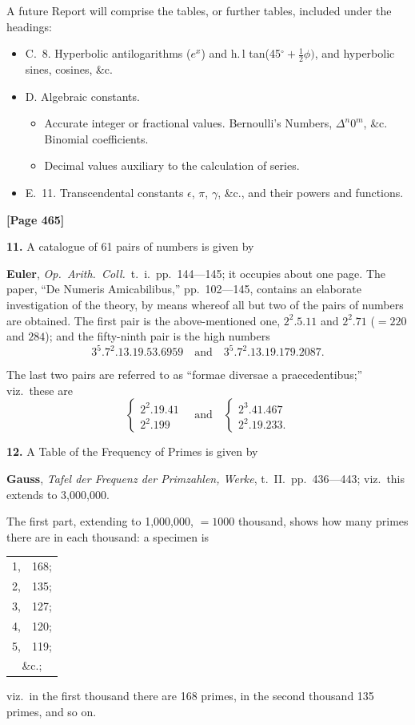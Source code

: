 \documentclass[11pt,a4paper]{book}
\begin{document}
A future Report will comprise the tables, or further tables, included under the headings:
\begin{itemize}[nosep]
\item C.\ 8. Hyperbolic antilogarithms ($e^{x}$) and h.\,l tan(45$^{\circ} + \frac{1}{2}\phi)$, and hyperbolic sines, cosines, \&c.
\item D. Algebraic constants.
\begin{itemize}[nosep]
\item[9.] Accurate integer or fractional values. Bernoulli's Numbers, $\Delta^{n} 0^{m}$, \&c. Binomial coefficients.
\item[10.] Decimal values auxiliary to the calculation of series.
\end{itemize}
\item E.\ 11. Transcendental constants $\epsilon$, $\pi$, $\gamma$, \&c., and their powers and functions.
\end{itemize}


\newpage
\textbf{[Page 465]}

\textbf{11.} A catalogue of 61 pairs of numbers is given by

\quad\textbf{Euler}, \textit{Op.\ Arith.\ Coll.}\ t.\ i.\ pp.\ 144---145; it occupies about one page. The paper, ``De Numeris Amicabilibus,'' pp.\ 102---145, contains an elaborate investigation of the theory, by means whereof all but two of the pairs of numbers are obtained. The first pair is the above-mentioned one, $2^{2}.5.11$ and $2^{2}.71$ ($= 220$ and $284$); and the fifty-ninth pair is the high numbers
\[3^{5}.7^{2}.13.19.53.6959 \quad \text{and} \quad 3^{5}.7^{2}.13.19.179.2087.\]

The last two pairs are referred to as ``formae diversae a praecedentibus;'' viz.\ these are
\[\left\{\begin{array}{l}2^{2}.19.41 \\ 2^{2}.199\end{array}\right. \quad \text{and} \quad \left\{\begin{array}{l}2^{3}.41.467 \\ 2^{2}.19.233.\end{array}\right.\]

\textbf{12.} A Table of the Frequency of Primes is given by

\quad\textbf{Gauss}, \textit{Tafel der Frequenz der Primzahlen, Werke}, t.\ II.\ pp.\ 436---443; viz.\ this extends to 3,000,000.

The first part, extending to 1,000,000, $= 1000$ thousand, shows how many primes there are in each thousand: a specimen is
\begin{center}
\begin{tabular}{r@{,\quad}r}
1, & 168; \\
2, & 135; \\
3, & 127; \\
4, & 120; \\
5, & 119; \\
\multicolumn{2}{c}{\&c.;}
\end{tabular}
\end{center}
viz.\ in the first thousand there are 168 primes, in the second thousand 135 primes, and so on.
\end{document}
